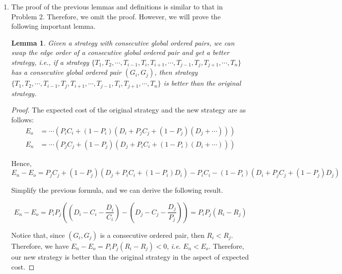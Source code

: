 \documentclass{oxmathproblems}
\makeatletter
\newtheorem{lemma}[theorem]{Lemma}
\theoremstyle{definition}
\renewenvironment{solution}[1][Solution] {\par\pushQED{\qed}\normalfont\topsep6\p@\@plus6\p@\relax\trivlist\item[\hskip\labelsep\bfseries#1\@addpunct{.}]\ignorespaces}{\popQED\endtrivlist\@endpefalse} \makeatother
\makeatother
\begin{document}
\begin{enumerate}
\begin{solution}
	The proof of the previous lemmas and definitions is similar to that in Problem 2. Therefore, we omit the proof. However, we will prove the following important lemma.
	\begin{lemma}\label{lemma14}
		Given a strategy with consecutive global ordered pairs, we can swap the edge order of a consecutive global ordered pair and get a better strategy, \textit{i.e.}, if a strategy $\{T_1, T_2, \cdots, T_{i-1}, T_i, T_{i+1}, \cdots, T_{j-1}, T_j, T_{j+1}, \cdots, T_n\}$ has a consecutive global ordered pair $(G_i, G_j)$, then strategy $\{T_1, T_2, \cdots, T_{i-1}, T_j, T_{i+1}, \cdots, T_{j-1}, T_i, T_{j+1}, \cdots, T_n\}$ is better than the original strategy.
	\end{lemma}
	\begin{proof}
		The expected cost of the original strategy and the new strategy are as follows:
		$$
		\begin{aligned}
		E_o &= \cdots(P_iC_i + (1-P_i)(D_i + P_jC_j + (1-P_j)(D_j + \cdots))) \\
		E_n &= \cdots(P_jC_j + (1-P_j)(D_j + P_iC_i + (1-P_i)(D_i + \cdots)))
		\end{aligned}
		$$
		
		Hence,
		$$
		E_n - E_o = P_jC_j + (1-P_j)(D_j+P_iC_i+(1-P_i)D_i) - P_iC_i - (1-P_i)(D_i + P_jC_j + (1-P_j)D_j)
		$$
		
		Simplify the previous formula, and we can derive the following result.
		
		$$
		E_n - E_o = P_iP_j\left( \left(D_i-C_i-\frac{D_i}{C_i}\right) - \left(D_j-C_j-\frac{D_j}{P_j}\right)\right) = P_iP_j(R_i-R_j)
		$$
		
		Notice that, since $(G_i, G_j)$ is a consecutive ordered pair, then $R_i < R_j$. Therefore, we have $E_n - E_o = P_iP_j(R_i-R_j) < 0$, \textit{i.e.} $E_n < E_o$. Therefore, our new strategy is better than the original strategy in the aspect of expected cost. 
	\end{proof}
	

\end{solution}
\end{enumerate}
\end{document}
